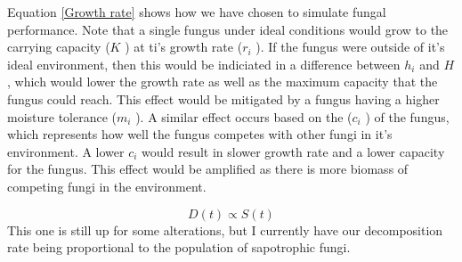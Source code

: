 \documentclass{article}
\begin{document}
\noindent
Equation \ref{Growth rate} shows how we have chosen to simulate fungal performance. Note that a single fungus under ideal conditions would grow to the carrying capacity ($ K $ ) at ti's growth rate ($ r_i $ ). If the fungus were outside of it's ideal environment, then this would be indiciated in a difference between $ h_i $ and $ H $, which would lower the growth rate as well as the maximum capacity that the fungus could reach. This effect would be mitigated by a fungus having a higher moisture tolerance ($ m_i $ ). A similar effect occurs based on the ($ c_i $ ) of the fungus, which represents how well the fungus competes with other fungi in it's environment. A lower $ c_i $ would result in slower growth rate and a lower capacity for the fungus. This effect would be amplified as there is more biomass of competing fungi in the environment. 


 \begin{equation}
     D(t) \propto S(t)
 \end{equation}
 \noindent
 This one is still up for some alterations, but I currently have our decomposition rate being proportional to the population of sapotrophic fungi.
 
 
\end{document}
